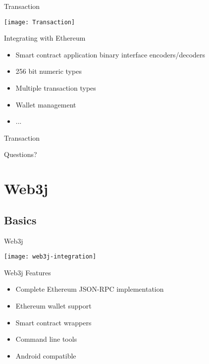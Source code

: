 \documentclass{beamer}
\begin{document}
\begin{frame}{Transaction}
	\begin{center}
		\texttt{[image: Transaction]}
	\end{center}
\end{frame}

\begin{frame}{Integrating with Ethereum}
	\begin{itemize}
		\item {
			Smart contract application binary interface
			encoders/decoders
		}
		\item {
			256 bit numeric types
		}
		\item {
			Multiple transaction types
		}
		\item {
			Wallet management
		}
		\item {
			...
		}
	\end{itemize}
\end{frame}

\begin{frame}{Transaction}
	\begin{center}
		Questions?
	\end{center}
\end{frame}

\section{Web3j}

\subsection{Basics}

\begin{frame}{Web3j}
	\begin{center}
		\texttt{[image: web3j-integration]}
	\end{center}
\end{frame}

\begin{frame}{Web3j Features}
	\begin{itemize}
		\item {
			Complete Ethereum JSON-RPC implementation
		}
		\item {
			Ethereum wallet support
		}
		\item {
			Smart contract wrappers
		}
		\item {
			Command line tools
		}
		\item {
			Android compatible
		}
	\end{itemize}
\end{frame}
\end{document}
